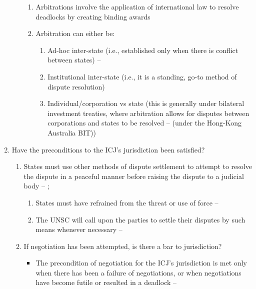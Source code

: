\begin{enumerate}
\begin{enumerate}
        \begin{enumerate}
            \item Arbitrations involve the application of international law to resolve deadlocks by creating binding awards
            \item Arbitration can either be:
            \begin{enumerate}
                \item Ad-hoc inter-state (i.e., established only when there is conflict between states) -- 
                \item Institutional inter-state (i.e., it is a standing, go-to method of dispute resolution)
                \item Individual/corporation vs state (this is generally under bilateral investment treaties, where arbitration allows for disputes between corporations and states to be resolved --  (under the Hong-Kong Australia BIT))
            \end{enumerate}
        \end{enumerate}
    \end{enumerate}
    \item Have the preconditions to the ICJ's jurisdiction been satisfied?
    \begin{enumerate}
        \item States must use other methods of dispute settlement to attempt to resolve the dispute in a peaceful manner before raising the dispute to a judicial body -- ; 
        \begin{enumerate}
            \item States must have refrained from the threat or use of force -- 
            \item The UNSC will call upon the parties to settle their disputes by such means whenever necessary -- 
        \end{enumerate}
        \item If negotiation has been attempted, is there a bar to jurisdiction?
        \begin{itemize}
            \item The precondition of negotiation for the ICJ's jurisdiction is met only when there has been a failure of negotiations, or when negotiations have become futile or resulted in a deadlock -- 

\end{itemize}
\end{enumerate}
\end{enumerate}
